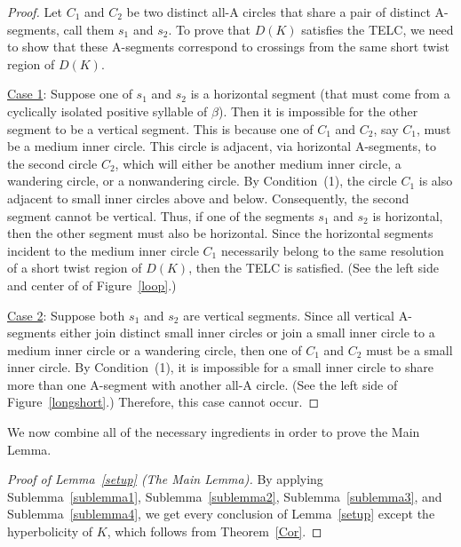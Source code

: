 \documentclass{article}
\begin{document}
\begin{proof} Let $C_{1}$ and $C_{2}$ be two distinct all-A circles that share a pair of distinct A-segments, call them $s_{1}$ and $s_{2}$. To prove that $D(K)$ satisfies the TELC, we need to show that these A-segments correspond to crossings from the same short twist region of $D(K)$.

\bigskip

\noindent \underline{Case 1}: Suppose one of $s_{1}$ and $s_{2}$ is a horizontal segment (that must come from a cyclically isolated positive syllable of $\beta$). Then it is impossible for the other segment to be a vertical segment. This is because one of $C_{1}$ and $C_{2}$, say $C_{1}$, must be a medium inner circle. This circle is adjacent, via horizontal A-segments, to the second circle $C_{2}$, which will either be another medium inner circle, a wandering circle, or a nonwandering circle. By Condition~(1), the circle $C_{1}$ is also adjacent to small inner circles above and below. Consequently, the second segment cannot be vertical. Thus, if one of the segments $s_{1}$ and $s_{2}$ is horizontal, then the other segment must also be horizontal. Since the horizontal segments incident to the medium inner circle $C_{1}$ necessarily belong to the same resolution of a short twist region of $D(K)$, then the TELC is satisfied. (See the left side and center of of Figure~\ref{loop}.) 

\bigskip

\noindent \underline{Case 2}: Suppose both $s_{1}$ and $s_{2}$ are vertical segments. Since all vertical A-segments either join distinct small inner circles or join a small inner circle to a medium inner circle or a wandering circle, then one of $C_{1}$ and $C_{2}$ must be a small inner circle. By Condition~(1), it is impossible for a small inner circle to share more than one A-segment with another all-A circle. (See the left side of Figure~\ref{longshort}.) Therefore, this case cannot occur.
\end{proof}

We now combine all of the necessary ingredients in order to prove the Main Lemma. 

\begin{proof}[Proof of Lemma~\ref{setup} (The Main Lemma)] By applying Sublemma~\ref{sublemma1}, Sublemma~\ref{sublemma2}, Sublemma~\ref{sublemma3}, and Sublemma~\ref{sublemma4}, we get every conclusion of Lemma~\ref{setup} except the hyperbolicity of $K$, which follows from Theorem~\ref{Cor}. 
\end{proof}
\end{document}
